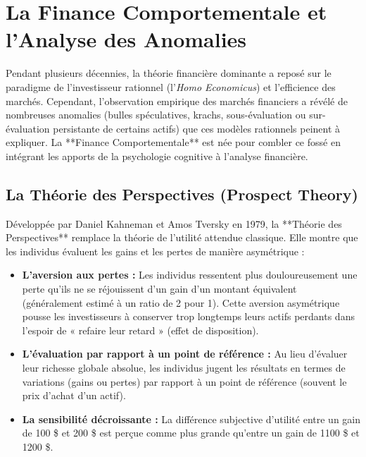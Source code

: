\section{La Finance Comportementale et l'Analyse des Anomalies}
Pendant plusieurs décennies, la théorie financière dominante a reposé sur le paradigme de l'investisseur rationnel (l'\textit{Homo Economicus}) et l'efficience des marchés. Cependant, l'observation empirique des marchés financiers a révélé de nombreuses anomalies (bulles spéculatives, krachs, sous-évaluation ou sur-évaluation persistante de certains actifs) que ces modèles rationnels peinent à expliquer. La **Finance Comportementale** est née pour combler ce fossé en intégrant les apports de la psychologie cognitive à l'analyse financière.

\subsection{La Théorie des Perspectives (Prospect Theory)}
Développée par Daniel Kahneman et Amos Tversky en 1979, la **Théorie des Perspectives** remplace la théorie de l'utilité attendue classique. Elle montre que les individus évaluent les gains et les pertes de manière asymétrique :
\begin{itemize}
    \item \textbf{L'aversion aux pertes :} Les individus ressentent plus douloureusement une perte qu'ils ne se réjouissent d'un gain d'un montant équivalent (généralement estimé à un ratio de 2 pour 1). Cette aversion asymétrique pousse les investisseurs à conserver trop longtemps leurs actifs perdants dans l'espoir de « refaire leur retard » (effet de disposition).
    \item \textbf{L'évaluation par rapport à un point de référence :} Au lieu d'évaluer leur richesse globale absolue, les individus jugent les résultats en termes de variations (gains ou pertes) par rapport à un point de référence (souvent le prix d'achat d'un actif).
    \item \textbf{La sensibilité décroissante :} La différence subjective d'utilité entre un gain de 100 \$ et 200 \$ est perçue comme plus grande qu'entre un gain de 1100 \$ et 1200 \$.
\end{itemize}

